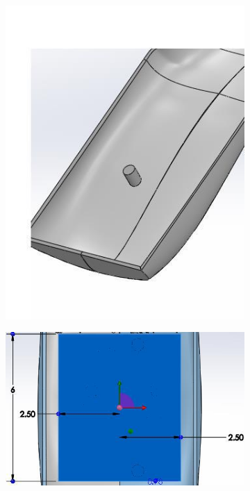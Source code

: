 \begin{figure}[!htbp]
    \centering
    \begin{subfigure}{.5\linewidth}
        \centering
        \includegraphics[width=\linewidth]{assets/conception1/img193.jpg}
    \end{subfigure}
    \hfill
     \begin{subfigure}{.45\linewidth}
        \centering
        \includegraphics[width=\linewidth]{assets/conception1/img196.jpg}
    \end{subfigure}
\end{figure}

